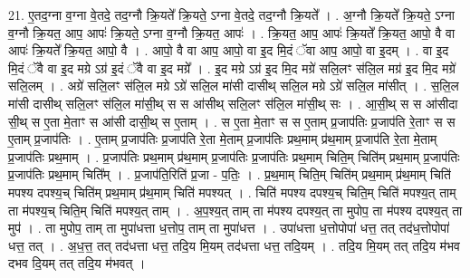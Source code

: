 \documentclass[17pt]{extarticle}
\begin{document}
21. ए॒तद॒ग्ना व॒ग्ना वे॒तदे॒ तद॒ग्नौ क्रि॒यते᳚ क्रि॒यते॒ ऽग्ना वे॒तदे॒ तद॒ग्नौ क्रि॒यते᳚ । . अ॒ग्नौ क्रि॒यते᳚ क्रि॒यते॒ ऽग्ना व॒ग्नौ क्रि॒यत॒ आप॒ आपः॑ क्रि॒यते॒ ऽग्ना व॒ग्नौ क्रि॒यत॒ आपः॑ । . क्रि॒यत॒ आप॒ आपः॑ क्रि॒यते᳚ क्रि॒यत॒ आपो॒ वै वा आपः॑ क्रि॒यते᳚ क्रि॒यत॒ आपो॒ वै । . आपो॒ वै वा आप॒ आपो॒ वा इ॒द मि॒दं ॅवा आप॒ आपो॒ वा इ॒दम् । . वा इ॒द मि॒दं ॅवै वा इ॒द मग्रे ऽग्र॑ इ॒दं ॅवै वा इ॒द मग्रे᳚ । . इ॒द मग्रे ऽग्र॑ इ॒द मि॒द मग्रे॑ सलि॒लꣳ स॑लि॒ल मग्र॑ इ॒द मि॒द मग्रे॑ सलि॒लम् । . अग्रे॑ सलि॒लꣳ स॑लि॒ल मग्रे ऽग्रे॑ सलि॒ल मा॑सी दासीथ् सलि॒ल मग्रे ऽग्रे॑ सलि॒ल मा॑सीत् । . स॒लि॒ल मा॑सी दासीथ् सलि॒लꣳ स॑लि॒ल मा॑सी॒थ् स स आ॑सीथ् सलि॒लꣳ स॑लि॒ल मा॑सी॒थ् सः । . आ॒सी॒थ् स स आ॑सीदा सी॒थ् स ए॒ता मे॒ताꣳ स आ॑सी दासी॒थ् स ए॒ताम् । . स ए॒ता मे॒ताꣳ स स ए॒ताम् प्र॒जाप॑तिः प्र॒जाप॑ति रे॒ताꣳ स स ए॒ताम् प्र॒जाप॑तिः । . ए॒ताम् प्र॒जाप॑तिः प्र॒जाप॑ति रे॒ता मे॒ताम् प्र॒जाप॑तिः प्रथ॒माम् प्र॑थ॒माम् प्र॒जाप॑ति रे॒ता मे॒ताम् प्र॒जाप॑तिः प्रथ॒माम् । . प्र॒जाप॑तिः प्रथ॒माम् प्र॑थ॒माम् प्र॒जाप॑तिः प्र॒जाप॑तिः प्रथ॒माम् चिति॒म् चिति॑म् प्रथ॒माम् प्र॒जाप॑तिः प्र॒जाप॑तिः प्रथ॒माम् चिति᳚म् । . प्र॒जाप॑ति॒रिति॑ प्र॒जा - प॒तिः॒ । . प्र॒थ॒माम् चिति॒म् चिति॑म् प्रथ॒माम् प्र॑थ॒माम् चिति॑ मपश्य दपश्य॒च् चिति॑म् प्रथ॒माम् प्र॑थ॒माम् चिति॑ मपश्यत् । . चिति॑ मपश्य दपश्य॒च् चिति॒म् चिति॑ मपश्य॒त् ताम् ता म॑पश्य॒च् चिति॒म् चिति॑ मपश्य॒त् ताम् । . अ॒प॒श्य॒त् ताम् ता म॑पश्य दपश्य॒त् ता मुपोप॒ ता म॑पश्य दपश्य॒त् ता मुप॑ । . ता मुपोप॒ ताम् ता मुपा॑धत्ता ध॒त्तोप॒ ताम् ता मुपा॑धत्त । . उपा॑धत्ता ध॒त्तोपोपा॑ धत्त॒ तत् तद॑ध॒त्तोपोपा॑ धत्त॒ तत् । . अ॒ध॒त्त॒ तत् तद॑धत्ता धत्त॒ तदि॒य मि॒यम् तद॑धत्ता धत्त॒ तदि॒यम् । . तदि॒य मि॒यम् तत् तदि॒य म॑भव दभव दि॒यम् तत् तदि॒य म॑भवत् । \newline
\end{document}
